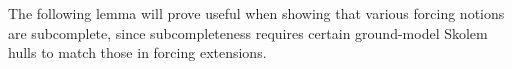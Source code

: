\documentclass{amsart}
\theoremstyle{definition}
\theoremstyle{remark}
\newcommand{\N}{{\overline{N}}}
\newcommand{\st}{\; | \;}
\newcommand{\set}[2]{\left\{#1\st #2 \right\}}
\newcommand{\rest}{\mathbin{\upharpoonright}}
\newcommand{\SH}{\mathcal{H}\textit{ull} \,}
\newcommand{\Sk}[3]{\SH^{#1}( {#2} \cup {#3} ) }
\begin{document}
%
%
%
%

The following lemma will prove useful when showing that various forcing notions are subcomplete, since subcompleteness requires certain ground-model Skolem hulls to match those in forcing extensions.
\end{document}
